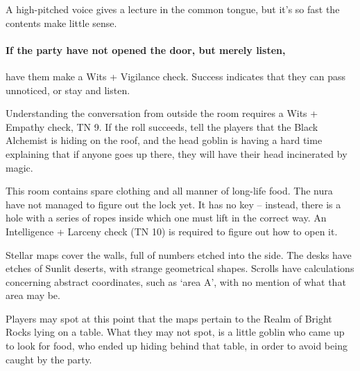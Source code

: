 \begin{multicols}{2}


\begin{boxtext}

	A high-pitched voice gives a lecture in the common tongue, but it's so fast the contents make little sense.

\end{boxtext}

\noindent
\paragraph{If the party have not opened the door, but merely listen,}
have them make a Wits + Vigilance check.
Success indicates that they can pass unnoticed, or stay and listen.


Understanding the conversation from outside the room requires a Wits + Empathy check, TN 9.
If the roll succeeds, tell the players that the Black Alchemist is hiding on the roof, and the head goblin is having a hard time explaining that if anyone goes up there, they will have their head incinerated by magic.

\goblinnuramancer



This room contains spare clothing and all manner of long-life food.
The nura have not managed to figure out the lock yet.
It has no key -- instead, there is a hole with a series of ropes inside which one must lift in the correct way.
An Intelligence + Larceny check (TN 10) is required to figure out how to open it.


\begin{boxtext}

	Stellar maps cover the walls, full of numbers etched into the side.
	The desks have etches of Sunlit deserts, with strange geometrical shapes.
	Scrolls have calculations concerning abstract coordinates, such as `area A', with no mention of what that area may be.

\end{boxtext}


\noindent
Players may spot at this point that the maps pertain to the Realm of Bright Rocks lying on a table.
What they may not spot, is a little goblin who came up to look for food, who ended up hiding behind that table, in order to avoid being caught by the party.


\end{multicols}
